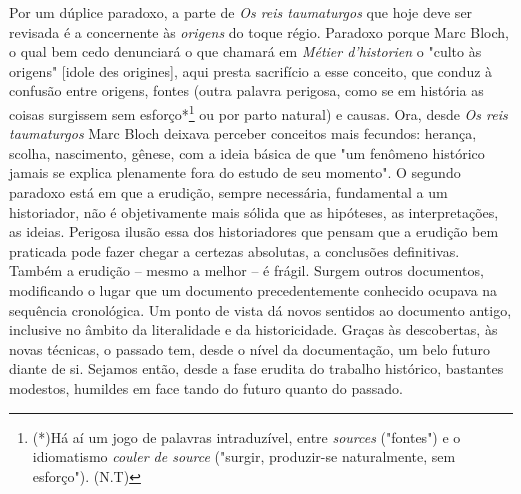 \documentclass[a5paper]{book}
\begin{document}
Por um dúplice paradoxo, a parte de \textit{Os reis taumaturgos} que hoje deve ser revisada é a concernente às \textit{origens} do toque régio. Paradoxo porque Marc Bloch, o qual bem cedo denunciará o que chamará em \textit{Métier d'historien} o "culto às origens" [idole des origines], aqui presta sacrifício a esse conceito, que conduz à confusão entre origens, fontes (outra palavra perigosa, como se em história as coisas surgissem sem esforço*{\let\thefootnote\relax\footnote{(*)Há aí um jogo de palavras intraduzível, entre \textit{sources} ("fontes") e o idiomatismo \textit{couler de source} ("surgir, produzir-se naturalmente, sem esforço"). (N.T)}} ou por parto natural) e causas. Ora, desde \textit{Os reis taumaturgos} Marc Bloch deixava perceber conceitos mais fecundos: herança, scolha, nascimento, gênese, com a ideia básica de que "um fenômeno histórico jamais se explica plenamente fora do estudo de seu momento". O segundo paradoxo está em que a erudição, sempre necessária, fundamental a um historiador, não é objetivamente mais sólida que as hipóteses, as interpretações, as ideias. Perigosa ilusão essa dos historiadores que pensam que a erudição bem praticada pode fazer chegar a certezas absolutas, a conclusões def{\kern0pt}initivas. Também a erudição -- mesmo a melhor -- é frágil. Surgem outros documentos, modif{\kern0pt}icando o lugar que um documento precedentemente conhecido ocupava na sequência cronológica. Um ponto de vista dá novos sentidos ao documento antigo, inclusive no âmbito da literalidade e da historicidade. Graças às descobertas, às novas técnicas, o passado tem, desde o nível da documentação, um belo futuro diante de si. Sejamos então, desde a fase erudita do trabalho histórico, bastantes modestos, humildes em face tando do futuro quanto do passado.
\end{document}
